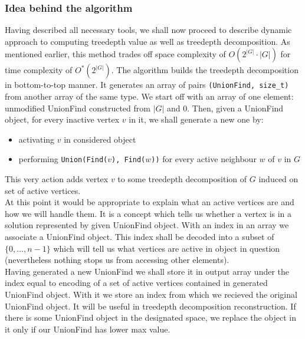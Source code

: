 \subsubsection{Idea behind the algorithm}
Having described all necessary tools, we shall now proceed to describe dynamic approach to computing treedepth value as well as treedepth decomposition. As mentioned earlier, this method trades off space complexity of $O\left(2^{\left|G\right|}\cdot\left|G\right|\right)$ for time complexity of  $O^{*}\left(2^{\left|G\right|}\right)$.
The algorithm builds the treedepth decomposition in bottom-to-top manner. It generates an array of pairs \texttt{(UnionFind, size\_t)} from another array of the same type. We start off with an array of one element: unmodified UnionFind constructed from $\left|G\right|$ and 0. Then, given a UnionFind object, for every inactive vertex $v$ in it, we shall generate a new one by:
\begin{itemize}
	\item activating $v$ in considered object
	\item performing \texttt{Union(Find($v$), Find($w$))} for every active neighbour $w$ of $v$ in $G$
\end{itemize}
This very action adds vertex $v$ to some treedepth decomposition of $G$ induced on set of active vertices.\\
At this point it would be appropriate to explain what an active vertices are and how we will handle them. It is a concept which tells us whether a vertex is in a solution represented by given UnionFind object. With an index in an array we associate a UnionFind object. This index shall be decoded into a subset of $\{0,...,n-1\}$ which will tell us what vertices are active in object in question (nevertheless nothing stops us from accessing other elements).\\
Having generated a new UnionFind we shall store it in output array under the index equal to encoding of a set of active vertices contained in generated UnionFind object. With it we store an index from which we recieved the original UnionFind object. It will be useful in treedepth decomposition reconstruction. If there is some UnionFind object in the designated space, we replace the object in it only if our UnionFind has lower max value.
